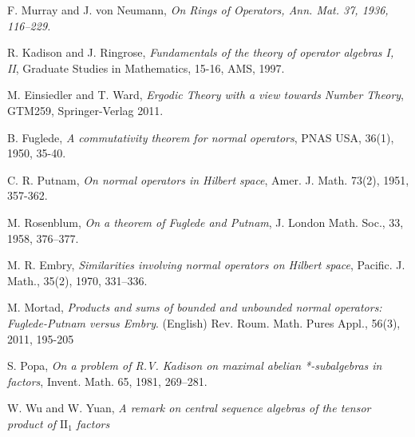 \documentclass[a4paper,10pt]{amsart}
\begin{document}
\begin{thebibliography}{9}
        F. Murray and J. von Neumann, 
        \em{On Rings of Operators}, 
        Ann. Mat. 37, 1936, 116–229. 

        R. Kadison and J. Ringrose,
        {\em Fundamentals of the theory of operator algebras I, II},
        Graduate Studies in Mathematics, 15-16, AMS, 1997. 

    M. Einsiedler and T. Ward, 
    {\em Ergodic Theory with a view towards Number Theory}, 
    GTM259, Springer-Verlag 2011.

        B. Fuglede,
        {\em A commutativity theorem for normal operators},
        PNAS USA, 36(1), 1950, 35-40.

        C. R. Putnam,
        {\em On normal operators in Hilbert space},
        Amer. J. Math. 73(2), 1951, 357-362.

        M. Rosenblum, 
        {\em On a theorem of Fuglede and Putnam}, 
        J. London Math. Soc., 33, 1958, 376–377.
    
        M. R. Embry, 
        {\em Similarities involving normal operators on Hilbert space}, 
        Pacific. J. Math., 35(2), 1970, 331–336.

        M. Mortad,
        {\em Products and sums of bounded and unbounded normal operators: 
        Fuglede-Putnam versus Embry}. 
        (English) Rev. Roum. Math. Pures Appl., 56(3), 2011, 195-205

         S. Popa, 
         {\em On a problem of R.V. Kadison on maximal 
         abelian *-subalgebras in factors}, 
         Invent. Math. 65, 1981, 269–281.

       W. Wu and W. Yuan, 
       {\em A remark on central sequence algebras
       of the tensor product of $\mathrm{II}_{1}$ factors}

\end{thebibliography}
\end{document}
